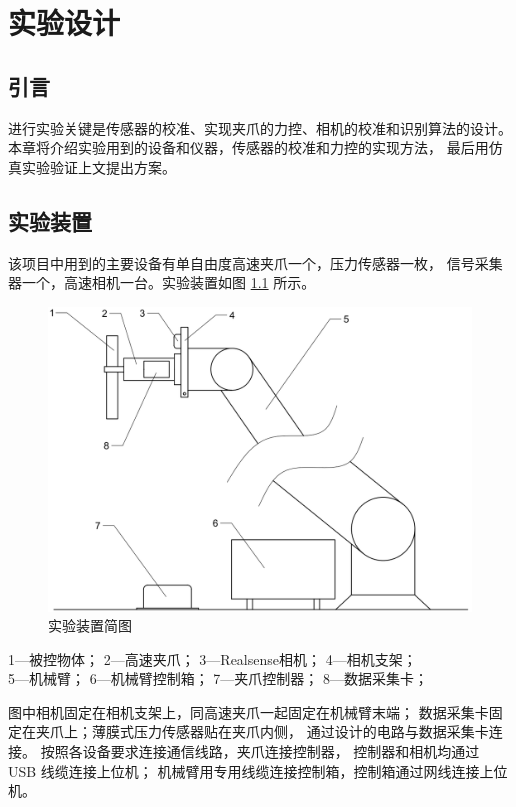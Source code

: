 \chapter{实验设计}

\section{引言}
进行实验关键是传感器的校准、实现夹爪的力控、相机的校准和识别算法的设计。
本章将介绍实验用到的设备和仪器，传感器的校准和力控的实现方法，
最后用仿真实验验证上文提出方案。

\section{实验装置}
该项目中用到的主要设备有单自由度高速夹爪一个，压力传感器一枚，
信号采集器一个，高速相机一台。实验装置如图 \ref{fig:4-1} 所示。

\begin{figure}[!ht]
  \centering
  \includegraphics[scale=0.4]{chapter04/pic/4-1}
  \caption{实验装置简图}
  \label{fig:4-1}
  \vspace{-0.3cm}
\end{figure}

\vspace{-10pt}
\begin{center}
  1---被控物体； 2---高速夹爪； 3---Realsense相机； 4---相机支架； \\
  5---机械臂； 6---机械臂控制箱； 7---夹爪控制器； 8---数据采集卡；
\end{center}

图中相机固定在相机支架上，同高速夹爪一起固定在机械臂末端；
数据采集卡固定在夹爪上；薄膜式压力传感器贴在夹爪内侧，
通过设计的电路与数据采集卡连接。
按照各设备要求连接通信线路，夹爪连接控制器，
控制器和相机均通过 USB 线缆连接上位机；
机械臂用专用线缆连接控制箱，控制箱通过网线连接上位机。


